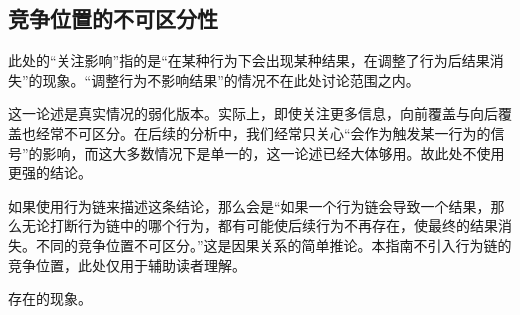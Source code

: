 \subsection{竞争位置的不可区分性}
\noindent {}\label{para:覆盖位置}
\begin{explain}
此处的“关注影响”指的是“在某种行为下会出现某种结果，在调整了行为后结果消失”的现象。“调整行为不影响结果”的情况不在此处讨论范围之内。

这一论述是真实情况的弱化版本。实际上，即使关注更多信息，向前覆盖与向后覆盖也经常不可区分。在后续的分析中，我们经常只关心“会作为触发某一行为的信号”的影响，而这大多数情况下是单一的，这一论述已经大体够用。故此处不使用更强的结论。

如果使用行为链来描述这条结论，那么会是“如果一个行为链会导致一个结果，那么无论打断行为链中的哪个行为，都有可能使后续行为不再存在，使最终的结果消失。不同的竞争位置不可区分。”这是因果关系的简单推论。本指南不引入行为链的竞争位置，此处仅用于辅助读者理解。
\end{explain}
存在的现象。

